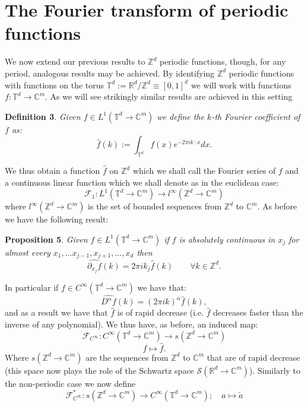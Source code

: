 \documentclass[
]{article}
\begin{document}
\hypertarget{the-fourier-transform-of-periodic-functions}{%
\section{The Fourier transform of periodic
functions}\label{the-fourier-transform-of-periodic-functions}}

We now extend our previous results to \({\mathbb Z}^d\) periodic
functions, though, for any period, analogous results may be achieved. By
identifying \({\mathbb Z}^d\) periodic functions with functions on the
torus \({\mathbb T}^d:={\mathbb R}^d/{\mathbb Z}^d\equiv [0,1]^d\) we
will work with functions \(f:{\mathbb T}^d\to\mathbb{C}^m.\) As we will
see strikingly similar results are achieved in this setting

\textbf{Definition 3}. \emph{Given
\(f\in L^1({\mathbb T}^d\to\mathbb{C}^m)\) we define the \emph{\(k\)-th
Fourier coefficient} of \(f\) as:
\[\hat{f}(k):=\int_{{\mathbb T}^d}f(x)e^{-2\pi ik\cdot x}dx.\]}

We thus obtain a function \(\hat{f}\) on \({\mathbb Z}^d\) which we
shall call the Fourier series of \(f\) and a continuous linear function
which we shall denote as in the euclidean case:
\[\mathcal{F}_1:L^1({\mathbb T}^d\to\mathbb{C}^m)\to l^\infty({\mathbb Z}^d\to\mathbb{C}^m)\]
where \(l^{\infty}({\mathbb Z}^d\to\mathbb{C}^m)\) is the set of bounded
sequences from \({\mathbb Z}^d\) to \(\mathbb{C}^m\). As before we have
the following result:

\leavevmode{}%
\textbf{Proposition 5}. \emph{Given
\(f\in L^1({\mathbb T}^d\to\mathbb{C}^m)\) if \(f\) is absolutely
continuous in \(x_j\) for almost every
\(x_1,...x_{j-1},x_{j+1},...,x_d\) then
\[\widehat{\partial_{x_j}{f}}(k)=2\pi i k_j\widehat{f}(k)\qquad\forall k\in{\mathbb Z}^d.\]}

In particular if \(f\in C^\infty({\mathbb T}^d\to\mathbb{C}^m)\) we have
that: \[\label{rgivesdpft}
    \widehat{D^\alpha f}(k)=(2\pi ik)^\alpha\hat{f}(k),\] and as a
result we have that \(\hat{f}\) is of rapid decrease (i.e. \(\hat{f}\)
decreases faster than the inverse of any polynomial). We thus have, as
before, an induced map:
\[\mathcal{F}_{C^\infty}:C^\infty({\mathbb T}^d\to\mathbb{C}^m)\to s({\mathbb Z}^d\to\mathbb{C}^m)\]
\[f\mapsto \hat{f}.\] Where \(s({\mathbb Z}^d\to\mathbb{C}^m)\) are the
sequences from \({\mathbb Z}^d\) to \(\mathbb{C}^m\) that are of rapid
decrease (this space now plays the role of the Schwartz space
\({\mathcal S}({\mathbb R}^d\to\mathbb{C}^m)\)). Similarly to the
non-periodic case we now define
\[\mathcal{F}^*_{C^\infty}:s({\mathbb Z}^d\to\mathbb{C}^m)\to C^\infty({\mathbb T}^d\to\mathbb{C}^m);\quad a\mapsto\check{a}\]
\end{document}

